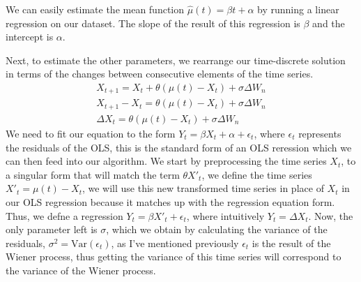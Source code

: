 \documentclass{article}
\begin{document}
\begin{spacing}{2.0}
We can easily estimate the mean function $\hat \mu(t) = \beta t + \alpha$ by running a linear regression on our dataset. The slope of the result of this regression is $\beta$ and
the intercept is $\alpha$.

Next, to estimate the other parameters, we rearrange our time-discrete solution in terms of the changes between consecutive elements of the time series.
\begin{gather*}
    X_{t + 1} = X_{t} + \theta \left ( \mu(t) - X_{t} \right )+ \sigma \Delta W_{n} \\
    X_{t + 1} - X_{t} = \theta \left ( \mu(t) - X_{t} \right )+ \sigma \Delta W_{n} \\
    \Delta X_{t} = \theta \left ( \mu(t) - X_{t} \right )+ \sigma \Delta W_{n}
\end{gather*}
We need to fit our equation to the form $Y_{t} = \beta X_{t} + \alpha + \epsilon_{t}$, where $\epsilon_{t}$ represents the residuals of the OLS, this is the standard form of an OLS
reression which we can then feed into our algorithm. We start by preprocessing the time series $X_{t}$, to a singular form that will match the term $\theta X'_{t}$, we define the
time series $X'_{t} = \mu(t) - X_{t}$, we will use this new transformed time series in place of $X_{t}$ in our OLS regression because it matches up with the regression equation form.
Thus, we defne a regression $Y_{t} = \beta X'_{t} + \epsilon_{t}$, where intuitively $Y_{t} = \Delta X_{t}$. Now, the only parameter left is $\sigma$, which we obtain by calculating
the variance of the residuals, $\sigma^{2} = \text{Var} \left ( \epsilon_{t} \right )$, as I've mentioned previously $\epsilon_{t}$ is the result of the Wiener process, thus getting
the variance of this time series will correspond to the variance of the Wiener process.


\end{spacing}
\end{document}
